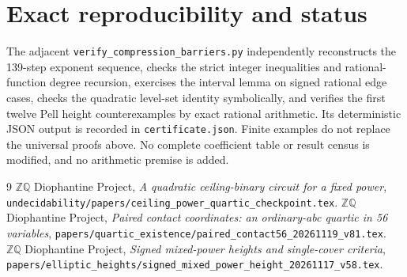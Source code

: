 \documentclass[11pt]{article}
\newcommand{\Q}{\mathbb Q}\newcommand{\Z}{\mathbb Z}
\begin{document}
\section{Exact reproducibility and status}

The adjacent \texttt{verify\_compression\_barriers.py} independently
reconstructs the 139-step exponent sequence, checks the strict integer
inequalities and rational-function degree recursion, exercises the interval lemma
on signed rational edge cases, checks the quadratic level-set identity
symbolically, and verifies the first twelve Pell height counterexamples
by exact rational arithmetic. Its deterministic JSON output is recorded
in \texttt{certificate.json}. Finite examples do not replace the
universal proofs above. No complete coefficient table or result census
is modified, and no arithmetic premise is added.

\begin{thebibliography}{9}
 \(\Z\Q\) Diophantine Project,
\emph{A quadratic ceiling-binary circuit for a fixed power},
\nolinkurl{undecidability/papers/ceiling_power_quartic_checkpoint.tex}.
 \(\Z\Q\) Diophantine Project,
\emph{Paired contact coordinates: an ordinary-abc quartic in 56 variables},
\nolinkurl{papers/quartic_existence/paired_contact56_20261119_v81.tex}.
 \(\Z\Q\) Diophantine Project,
\emph{Signed mixed-power heights and single-cover criteria},
\nolinkurl{papers/elliptic_heights/signed_mixed_power_height_20261117_v58.tex}.
\end{thebibliography}
\end{document}
